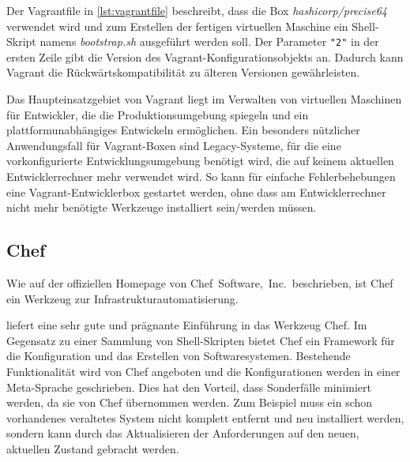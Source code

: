 
Der Vagrantfile in \cref{lst:vagrantfile} beschreibt, dass die Box \emph{hashicorp/precise64} verwendet wird und zum Erstellen der fertigen virtuellen Maschine ein Shell-Skript namens \emph{bootstrap.sh} ausgeführt werden soll.
Der Parameter \lstinline{"2"} in der ersten Zeile gibt die Version des Vagrant-Konfigurationsobjekts an.
Dadurch kann Vagrant die Rückwärtskompatibilität zu älteren Versionen gewährleisten.


Das Haupteinsatzgebiet von Vagrant liegt im Verwalten von virtuellen Maschinen für Entwickler, die die Produktionsumgebung spiegeln und ein plattformunabhängiges Entwickeln ermöglichen.
Ein besonders nützlicher Anwendungsfall für Vagrant-Boxen sind Legacy-Systeme, für die eine vorkonfigurierte Entwicklungsumgebung benötigt wird, die auf keinem aktuellen Entwicklerrechner mehr verwendet wird.
So kann für einfache Fehlerbehebungen eine Vagrant-Entwicklerbox gestartet werden, ohne dass am Entwicklerrechner nicht mehr benötigte Werkzeuge installiert sein/werden müssen.


\subsection{Chef}
\label{sub:chef}
Wie auf der offiziellen Homepage \autocite{Chef:online} von Chef~Software,~Inc.\ beschrieben, ist Chef ein Werkzeug zur Infrastrukturautomatisierung.

\autocite{Wolff201604} liefert eine sehr gute und prägnante Einführung in das Werkzeug Chef.
Im Gegensatz zu einer Sammlung von Shell-Skripten bietet Chef ein Framework für die Konfiguration und das Erstellen von Softwaresystemen.
Bestehende Funktionalität wird von Chef angeboten und die Konfigurationen werden in einer Meta-Sprache geschrieben.
Dies hat den Vorteil, dass Sonderfälle minimiert werden, da sie von Chef übernommen werden. Zum Beispiel muss ein schon vorhandenes veraltetes System nicht komplett entfernt und neu installiert werden, sondern kann durch das Aktualisieren der Anforderungen auf den neuen, aktuellen Zustand gebracht werden.

